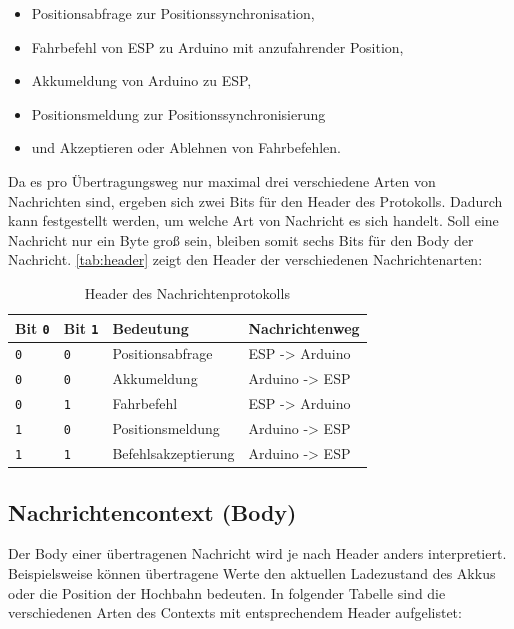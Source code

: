 \begin{itemize}
	\item Positionsabfrage zur Positionssynchronisation,
	\item Fahrbefehl von ESP zu Arduino mit anzufahrender Position,
	\item Akkumeldung von Arduino zu ESP,
	\item Positionsmeldung zur Positionssynchronisierung
	\item und Akzeptieren oder Ablehnen von Fahrbefehlen.
\end{itemize}

Da es pro Übertragungsweg nur maximal drei verschiedene Arten von Nachrichten sind, ergeben sich zwei Bits für den Header des Protokolls. Dadurch kann festgestellt werden, um welche Art von Nachricht es sich handelt.
Soll eine Nachricht nur ein Byte groß sein, bleiben somit sechs Bits für den Body der Nachricht. 
\autoref{tab:header} zeigt den Header der verschiedenen Nachrichtenarten:
\begin{table}[h]
	\begin{center}
		\begin{tabular}{m{2cm} | m{2cm} | m{5cm} | m{5cm}}
			Bit \texttt{0} & Bit \texttt{1} & Bedeutung & Nachrichtenweg\\
			\hline 
			\texttt{0} & \texttt{0} & Positionsabfrage  & ESP      ->  Arduino\\
			\hline 
			\texttt{0} & \texttt{0} & Akkumeldung & Arduino  ->      ESP\\
			\hline 
			\texttt{0} & \texttt{1} & Fahrbefehl & ESP      ->  Arduino\\
			\hline 
			\texttt{1} & \texttt{0} & Positionsmeldung & Arduino  ->      ESP\\
			\hline 
			\texttt{1} & \texttt{1} & Befehlsakzeptierung & Arduino  ->      ESP\\
		\end{tabular}
	\end{center}
	\caption{\label{tab:header}Header des Nachrichtenprotokolls}
\end{table}

\subsection{Nachrichtencontext (Body)}
Der Body einer übertragenen Nachricht wird je nach Header anders interpretiert. Beispielsweise können übertragene Werte den aktuellen Ladezustand des Akkus oder die Position der Hochbahn bedeuten. 
In folgender Tabelle sind die verschiedenen Arten des Contexts mit entsprechendem Header aufgelistet:

